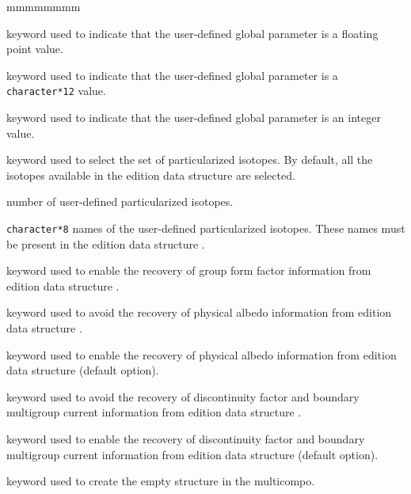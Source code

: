 \begin{ListeDeDescription}{mmmmmmmm}
\item[\moc{REAL}] keyword used to indicate that the user-defined global parameter
is a floating point value.

\item[\moc{CHAR}] keyword used to indicate that the user-defined global parameter
is a {\tt character*12} value.

\item[\moc{INTE}] keyword used to indicate that the user-defined global parameter
is an integer value.

\item[\moc{ISOT}] keyword used to select the set of particularized isotopes. By default, all the
isotopes available in the {\sc edition} data structure  are selected.

\item[\dusa{nisp}] number of user-defined particularized isotopes.

\item[\dusa{HISOP}] {\tt character*8} names of the user-defined particularized isotopes. These names must be present
in the {\sc edition} data structure .

\item[\moc{GFF}] keyword used to enable the recovery of group form factor information from {\sc edition} data structure .

\item[\moc{NOALBP}] keyword used to avoid the recovery of physical albedo information from {\sc edition} data structure .

\item[\moc{ALBP}] keyword used to enable the recovery of physical albedo information from {\sc edition} data structure  (default option).

\item[\moc{NOJSURF}] keyword used to avoid the recovery of discontinuity factor and boundary multigroup current information from {\sc edition} data structure .

\item[\moc{JSURF}] keyword used to enable the recovery of discontinuity factor and boundary multigroup current information from {\sc edition} data structure  (default option).

\item[\moc{INIT}] keyword used to create the empty structure in the {\sc multicompo}.

\end{ListeDeDescription}

